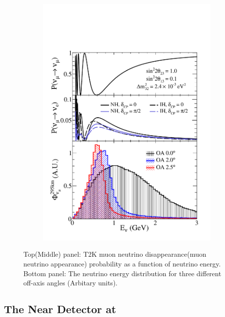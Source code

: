 \begin{figure}[h]
  \begin{subfigure}[t]{0.7\textwidth}
    \includegraphics[width=\textwidth, trim={0mm 0mm 0mm 0mm}, clip,page=1]{Figures/Detectors/T2KOffAxisTrick.pdf}
  \end{subfigure}
    \caption{Top(Middle) panel: T2K muon neutrino disappearance(muon neutrino appearance) probability as a function of neutrino energy. Bottom panel: The neutrino energy distribution for three different off-axis angles (Arbitary units).}
  \label{fig:T2KSKExp_T2K_OffAxisTrick}
\end{figure}

\subsection{The Near Detector at }
\label{subsec:T2KSKExp_T2K_ND280}

